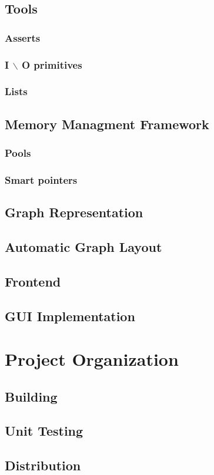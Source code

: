 \documentclass{article}
\begin{document}
\subsection{Tools}
\subsubsection{Asserts}
\subsubsection{I $\backslash$ O primitives}
\subsubsection{Lists}
\subsection{Memory Managment Framework}
\subsubsection{Pools}
\subsubsection{Smart pointers}
\subsection{Graph Representation}
\subsection{Automatic Graph Layout}
\subsection{Frontend}
\subsection{GUI Implementation}
\section{Project Organization}
\subsection{Building}
\subsection{Unit Testing}
\subsection{Distribution}
\end{document}

